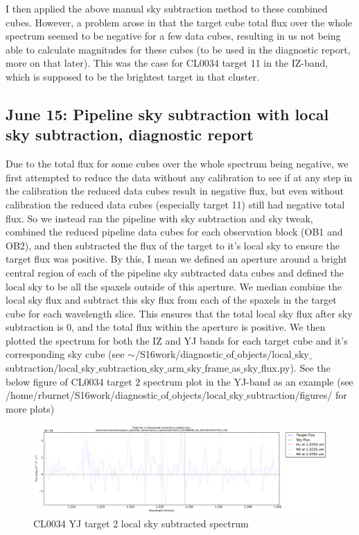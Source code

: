 \documentclass[10pt,letterpaper]{article}
\begin{document}
I then applied the above manual sky subtraction method to these combined cubes. However, a problem arose in that the target cube total flux over the whole spectrum seemed to be negative for a few data cubes, resulting in us not being able to calculate magnitudes for these cubes (to be used in the diagnostic report, more on that later). This was the case for CL0034 target 11 in the IZ-band, which is supposed to be the brightest target in that cluster.

\subsection{June 15: Pipeline sky subtraction with local sky subtraction, diagnostic report}
Due to the total flux for some cubes over the whole spectrum being negative, we first attempted to reduce the data without any calibration to see if at any step in the calibration the reduced data cubes result in negative flux, but even without calibration the reduced data cubes (especially target 11) still had negative total flux. So we instead ran the pipeline with sky subtraction and sky tweak, combined the reduced pipeline data cubes for each observation block (OB1 and OB2), and then subtracted the flux of the target to it's local sky to ensure the target flux was positive. By this, I mean we defined an aperture around a bright central region of each of the pipeline sky subtracted data cubes and defined the local sky to be all the spaxels outside of this aperture. We median combine the local sky flux and subtract this sky flux from each of the spaxels in the target cube for each wavelength slice. This ensures that the total local sky flux after sky subtraction is 0, and the total flux within the aperture is positive. We then plotted the spectrum for both the IZ and YJ bands for each target cube and it's corresponding sky cube (see $\sim$/S16work/diagnostic$\_$of$\_$objects/local$\_$sky$\_$subtraction/local$\_$sky$\_$subtraction$\_$sky$\_$arm$\_$sky$\_$frame$\_$as$\_$sky$\_$flux.py). See the below figure of CL0034 target 2 spectrum plot in the YJ-band as an example (see \\/home/rburnet/S16work/diagnostic$\_$of$\_$objects/local$\_$sky$\_$subtraction/figures/ for more plots)\\

\begin{figure}[h!]
\caption{CL0034 YJ target 2 local sky subtracted spectrum}\label{fig:CL0034 YJ target 2 local sky subtracted spectrum}
\includegraphics[scale=0.4]{figures/COMBINE_SCI_RECONSTRUCTED_2_Halpha.pdf}
\end{figure}
\end{document}
